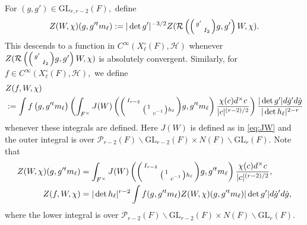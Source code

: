 \documentclass[12pt]{amsart}
\theoremstyle{remark}
\numberwithin{equation}{section}
\newcommand{\GL}{\mathrm{GL}}
\theoremstyle{definition}
\newenvironment{psmatrix}
  {\left(\begin{smallmatrix}}
  {\end{smallmatrix}\right)}
\numberwithin{equation}{subsection}
\begin{document}
  For $(g,g') \in \GL_{r,r-2}(F),$ define
\begin{align} \label{ZWchi:func}
Z(W,\chi)(g,g'^tm_{\ell}):=|\det g'|^{-3/2}Z(\mathcal{R}\left(\begin{psmatrix}
        g' & \\
         & I_2
    \end{psmatrix}g,g'\right)W,\chi). 
\end{align}
This descends to a function in $C^\infty(X^{\circ}_{\ell}(F),\mathcal{H})$ whenever $Z(\mathcal{R}\left(\begin{psmatrix}
        g' & \\
         & I_2
    \end{psmatrix}g,g'\right)W,\chi)$ is absolutely convergent. Similarly, for $f \in  C^\infty(X^\circ_{\ell}(F),\mathcal{H}),$ we define 
\begin{align} \begin{split} \label{Zint:2}
&Z(f,W,\chi)\\
&:=\int f\left(g,g'^tm_{\ell}\right) \left(\int_{F^\times} J(W)\left(\begin{psmatrix}
        I_{r-2} & \\
           & \begin{psmatrix} 1 & \\ & c^{-1}\end{psmatrix}h_\ell
\end{psmatrix}g,g'^tm_\ell\right)\frac{\chi(c)d^\times c}{|c|^{(r-2)/2}}\right)\frac{|\det g'|d\dot{g}'d\dot{g}}{|\det h_\ell|^{2-r}}
    \end{split}
\end{align}
whenever these integrals are defined.  Here $J(W)$ is defined as in \eqref{eq:JW} and the outer integral is over $\mathcal{P}_{r-2}(F) \backslash \GL_{r-2}(F) \times N(F) \backslash \GL_r(F)$. Note that 
\begin{align} \label{Z:ids} \begin{split}
    Z(W,\chi)(g,g'^tm_\ell)&=\int_{F^\times} J(W)\left(\begin{psmatrix}
        I_{r-2} & \\
           & \begin{psmatrix} 1 & \\ & c^{-1}\end{psmatrix}h_\ell
\end{psmatrix}g,g'^tm_\ell\right)\frac{\chi(c)d^\times c}{|c|^{(r-2)/2}},\\
    Z(f,W,\chi)&=|\det h_\ell|^{r-2}\int  f(g,g'^tm_\ell)Z(W,\chi)(g,g'^tm_{\ell})|\det g'| d\dot{g}'d\dot{g}, \end{split}
\end{align}
where the lower integral is over $\mathcal{P}_{r-2}(F) \backslash \GL_{r-2}(F) \times N(F) \backslash \GL_r(F).$
\end{document}
